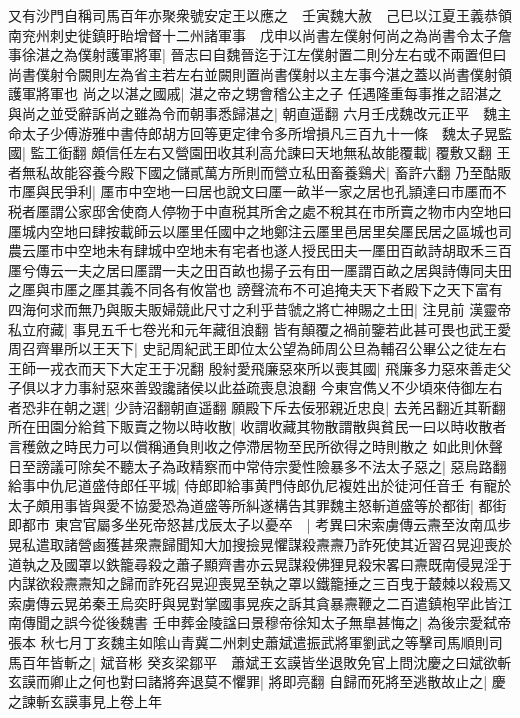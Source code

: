 又有沙門自稱司馬百年亦聚衆號安定王以應之　壬寅魏大赦　己巳以江夏王義恭領南兖州刺史徙鎮盱眙增督十二州諸軍事　戊申以尚書左僕射何尚之為尚書令太子詹事徐湛之為僕射護軍將軍|{
	晉志曰自魏晉迄于江左僕射置二則分左右或不兩置但曰尚書僕射令闕則左為省主若左右並闕則置尚書僕射以主左事今湛之蓋以尚書僕射領護軍將軍也}
尚之以湛之國戚|{
	湛之帝之甥會稽公主之子}
任遇隆重每事推之詔湛之與尚之並受辭訴尚之雖為令而朝事悉歸湛之|{
	朝直遥翻}
六月壬戌魏改元正平　魏主命太子少傅游雅中書侍郎胡方回等更定律令多所增損凡三百九十一條　魏太子晃監國|{
	監工衘翻}
頗信任左右又營園田收其利高允諫曰天地無私故能覆載|{
	覆敷又翻}
王者無私故能容養今殿下國之儲貳萬方所則而營立私田畜養鷄犬|{
	畜許六翻}
乃至酤販市㕓與民爭利|{
	㕓市中空地一曰居也說文曰㕓一畝半一家之居也孔頴達曰市㕓而不税者㕓謂公家邸舍使商人停物于中直税其所舍之處不稅其在市所賣之物市内空地曰㕓城内空地曰肆按載師云以㕓里任國中之地鄭注云㕓里邑居里矣㕓民居之區城也司農云㕓市中空地未有肆城中空地未有宅者也遂人授民田夫一㕓田百畝詩胡取禾三百㕓兮傳云一夫之居曰㕓謂一夫之田百畝也揚子云有田一㕓謂百畝之居與詩傳同夫田之㕓與市㕓之㕓其義不同各有攸當也}
謗聲流布不可追掩夫天下者殿下之天下富有四海何求而無乃與販夫販婦競此尺寸之利乎昔虢之將亡神賜之土田|{
	注見前}
漢靈帝私立府藏|{
	事見五千七卷光和元年藏徂浪翻}
皆有顛覆之禍前鑒若此甚可畏也武王愛周召齊畢所以王天下|{
	史記周紀武王即位太公望為師周公旦為輔召公畢公之徒左右王師一戎衣而天下大定王于况翻}
殷紂愛飛廉惡來所以喪其國|{
	飛廉多力惡來善走父子俱以才力事紂惡來善毀讒諸侯以此益疏喪息浪翻}
今東宫儁乂不少頃來侍御左右者恐非在朝之選|{
	少詩沼翻朝直遥翻}
願殿下斥去佞邪親近忠良|{
	去羌呂翻近其靳翻}
所在田園分給貧下販賣之物以時收散|{
	收謂收藏其物散謂散與貧民一曰以時收散者言穫斂之時民力可以償稱通負則收之停滯居物至民所欲得之時則散之}
如此則休聲日至謗議可除矣不聽太子為政精察而中常侍宗愛性險暴多不法太子惡之|{
	惡烏路翻}
給事中仇尼道盛侍郎任平城|{
	侍郎即給事黄門侍郎仇尼複姓出於徒河任音壬}
有寵於太子頗用事皆與愛不協愛恐為道盛等所糾遂構告其罪魏主怒斬道盛等於都街|{
	都街即都市}
東宫官屬多坐死帝怒甚戊辰太子以憂卒　|{
	考異曰宋索虜傳云燾至汝南瓜步晃私遣取諸營鹵獲甚衆燾歸聞知大加搜撿晃懼謀殺燾燾乃詐死使其近習召晃迎喪於道執之及國罩以鉄籠尋殺之蕭子顯齊書亦云晃謀殺佛狸見殺宋畧曰燾既南侵晃淫于内謀欲殺燾燾知之歸而詐死召晃迎喪晃至執之罩以鐵籠捶之三百曳于樷棘以殺焉又索虜傳云晃弟秦王烏奕盱與晃對掌國事晃疾之訴其貪暴燾鞭之二百遣鎮枹罕此皆江南傳聞之誤今從後魏書}
壬申葬金陵諡曰景穆帝徐知太子無臯甚悔之|{
	為後宗愛弑帝張本}
秋七月丁亥魏主如隂山青冀二州刺史蕭斌遣振武將軍劉武之等擊司馬順則司馬百年皆斬之|{
	斌音彬}
癸亥梁鄒平　蕭斌王玄謨皆坐退敗免官上問沈慶之曰斌欲斬玄謨而卿止之何也對曰諸將奔退莫不懼罪|{
	將即亮翻}
自歸而死將至逃散故止之|{
	慶之諫斬玄謨事見上卷上年}
